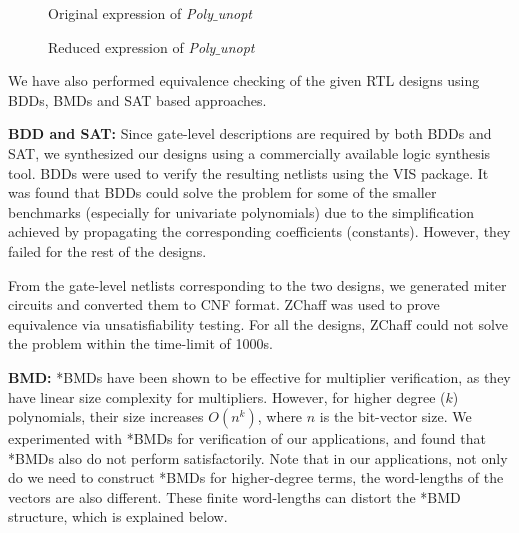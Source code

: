 \begin{figure}[htb]
\epsfysize=3.5cm
\centerline{}
\caption{Original expression of {\it Poly$\_$unopt}}
\label{fig:poly1}
\end{figure}
\begin{figure}[htb]
\epsfysize=3.5cm
\centerline{}
\caption{Reduced expression of {\it Poly$\_$unopt}}
\label{fig:poly2}
\end{figure}


We have also performed equivalence checking of the given RTL designs
using BDDs, BMDs and SAT based approaches.  
 
{\bf BDD and SAT:} Since gate-level descriptions are required by both
BDDs and SAT, we synthesized our designs using a commercially
available logic synthesis tool. BDDs were used to verify the resulting
netlists using the VIS \cite{BHEL96} package. It was found that BDDs
could solve the problem for some of the smaller benchmarks (especially
for univariate polynomials) due to the simplification achieved by
propagating the corresponding coefficients (constants). However, they
failed for the rest of the designs. 

From the gate-level netlists corresponding to the two designs, we
generated miter circuits and converted them to CNF format. ZChaff
\cite{chaff} was used to prove equivalence via unsatisfiability
testing. For all the designs, ZChaff could not solve the problem
within the time-limit of 1000s.

{\bf *BMD:} *BMDs have been shown to be effective for multiplier
verification, as they have linear  size complexity for
multipliers. However, for higher degree ($k$) polynomials, their size
increases $O(n^k)$, where $n$ is the bit-vector size. We experimented
with *BMDs for verification of our applications, and found that *BMDs
also do not perform satisfactorily. Note that in our applications, not
only do we need to construct *BMDs for higher-degree terms, the
word-lengths of the vectors are also different. These finite
word-lengths can distort the *BMD structure, which is explained below.

